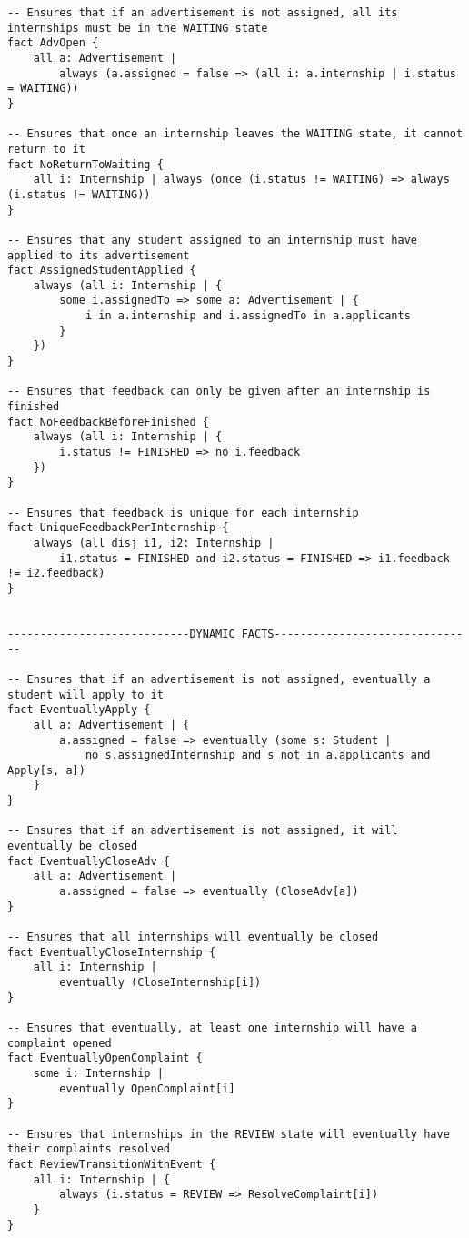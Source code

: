 \begin{lstlisting}
-- Ensures that if an advertisement is not assigned, all its internships must be in the WAITING state
fact AdvOpen {
    all a: Advertisement |
        always (a.assigned = false => (all i: a.internship | i.status = WAITING))
}

-- Ensures that once an internship leaves the WAITING state, it cannot return to it
fact NoReturnToWaiting {
    all i: Internship | always (once (i.status != WAITING) => always (i.status != WAITING))
}

-- Ensures that any student assigned to an internship must have applied to its advertisement
fact AssignedStudentApplied {
    always (all i: Internship | {
        some i.assignedTo => some a: Advertisement | {
            i in a.internship and i.assignedTo in a.applicants
        }
    })
}

-- Ensures that feedback can only be given after an internship is finished
fact NoFeedbackBeforeFinished {
    always (all i: Internship | {
        i.status != FINISHED => no i.feedback
    })
}

-- Ensures that feedback is unique for each internship
fact UniqueFeedbackPerInternship {
    always (all disj i1, i2: Internship | 
        i1.status = FINISHED and i2.status = FINISHED => i1.feedback != i2.feedback)
}


----------------------------DYNAMIC FACTS-------------------------------

-- Ensures that if an advertisement is not assigned, eventually a student will apply to it
fact EventuallyApply {
    all a: Advertisement | {
        a.assigned = false => eventually (some s: Student | 
            no s.assignedInternship and s not in a.applicants and Apply[s, a])
    }
}

-- Ensures that if an advertisement is not assigned, it will eventually be closed
fact EventuallyCloseAdv {
    all a: Advertisement |
        a.assigned = false => eventually (CloseAdv[a])
}

-- Ensures that all internships will eventually be closed
fact EventuallyCloseInternship {
    all i: Internship |
        eventually (CloseInternship[i])
}

-- Ensures that eventually, at least one internship will have a complaint opened
fact EventuallyOpenComplaint {
    some i: Internship | 
        eventually OpenComplaint[i]
}

-- Ensures that internships in the REVIEW state will eventually have their complaints resolved
fact ReviewTransitionWithEvent {
    all i: Internship | {
        always (i.status = REVIEW => ResolveComplaint[i])
    }
}



\end{lstlisting}

